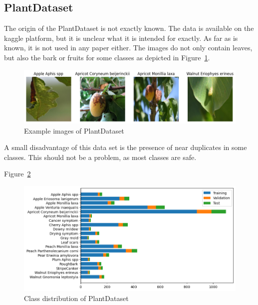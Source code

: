 \subsection{PlantDataset}
The origin of the PlantDataset is not exactly known. The data is available on the kaggle platform, but it is unclear what it is intended for exactly. As far as is known, it is not used in any paper either.
The images do not only contain leaves, but also the bark or fruits for some classes as depicted in Figure~\ref{fig:example_images_of_plantdataset}.
\begin{figure}[H]
    \begin{center}
    \includegraphics[width=15cm]{../images/example_images_of_plantdataset.png}
    \caption{Example images of PlantDataset}\label{fig:example_images_of_plantdataset}
    \end{center}
\end{figure}
A small disadvantage of this data set is the presence of near duplicates in some classes. This should not be a problem, as most classes are safe.

Figure~\ref{fig:class_distribution_of_plantdataset}
\begin{figure}[H]
    \begin{center}
    \includegraphics[width=15cm]{../images/class_distribution_of_plantdataset.png}
    \caption{Class distribution of PlantDataset}\label{fig:class_distribution_of_plantdataset}
    \end{center}
\end{figure}

